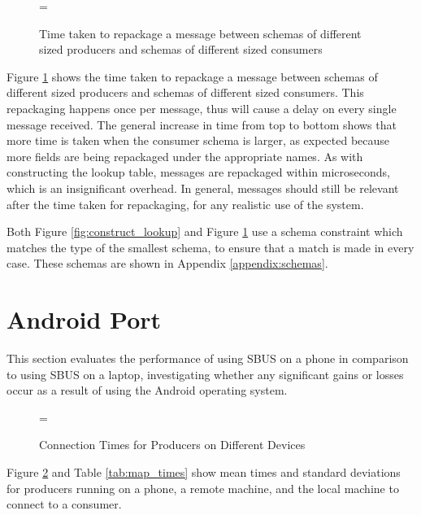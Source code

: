 \documentclass[12pt,twoside,notitlepage]{report}
\begin{document}
\begin{figure}
\epsfxsize=\hsize
\centerline{}
\caption[Repackage Message]{Time taken to repackage a message between schemas of different sized producers and schemas of different sized consumers}
\label{fig:repack_message}
\end{figure}

Figure \ref{fig:repack_message} shows the time taken to repackage a message between schemas of different sized producers and schemas of different sized consumers. 
This repackaging happens once per message, thus will cause a delay on every single message received. 
The general increase in time from top to bottom shows that more time is taken when the consumer schema is larger, as expected because more fields are being repackaged under the appropriate names. 
As with constructing the lookup table, messages are repackaged within microseconds, which is an insignificant overhead. 
In general, messages should still be relevant after the time taken for repackaging, for any realistic use of the system.

Both Figure \ref{fig:construct_lookup} and Figure \ref{fig:repack_message} use a schema constraint which matches the type of the smallest schema, to ensure that a match is made in every case. 
These schemas are shown in Appendix \ref{appendix:schemas}. 

\section{Android Port}

This section evaluates the performance of using SBUS on a phone in comparison to using SBUS on a laptop, investigating whether any significant gains or losses occur as a result of using the Android operating system. 

\begin{figure}[t]
\epsfxsize=\hsize
\centerline{}
\caption{Connection Times for Producers on Different Devices}
\label{fig:map_times}
\end{figure}

Figure \ref{fig:map_times} and Table \ref{tab:map_times} show mean times and standard deviations for producers running on a phone, a remote machine, and the local machine to connect to a consumer. 
\end{document}

